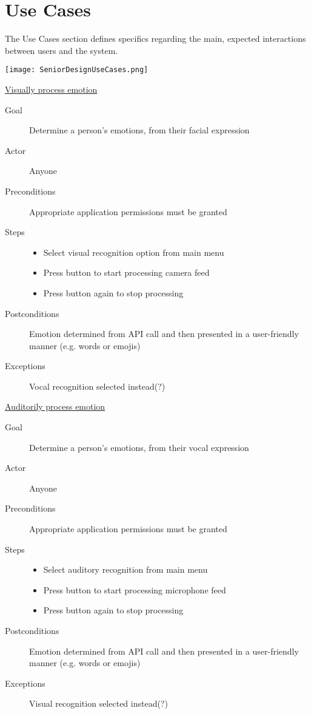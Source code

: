 \chapter{Use Cases}
The Use Cases section defines specifics regarding the main, expected interactions between users and the system.
\vspace{5mm}
\begin{center}
    \texttt{[image: SeniorDesignUseCases.png]}
\end{center}

\underline{Visually process emotion}
\begin{description}
    \item[Goal] Determine a person's emotions, from their facial expression
    \item[Actor] Anyone
    \item[Preconditions] Appropriate application permissions must be granted
    \item[Steps]
        \begin{itemize}
            \item{Select visual recognition option from main menu}
            \item{Press button to start processing camera feed}
            \item{Press button again to stop processing}
        \end{itemize}
    \item[Postconditions] Emotion determined from API call and then presented in a user-friendly manner (e.g. words or emojis)
    \item[Exceptions] Vocal recognition selected instead(?)
\end{description}

\vspace{5mm}

\underline{Auditorily process emotion}
\begin{description}
    \item[Goal] Determine a person's emotions, from their vocal expression
    \item[Actor] Anyone
    \item[Preconditions] Appropriate application permissions must be granted
    \item[Steps]
        \begin{itemize}
            \item{Select auditory recognition from main menu}
            \item{Press button to start processing microphone feed}
            \item{Press button again to stop processing}
        \end{itemize}
    \item[Postconditions] Emotion determined from API call and then presented in a user-friendly manner (e.g. words or emojis)
    \item[Exceptions] Visual recognition selected instead(?)
\end{description}

